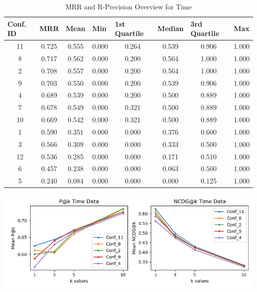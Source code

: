\documentclass[12pt]{article}
\begin{document}
\begin{table}[H]
\centering
\begin{tabular}{|c|c|c|c|c|c|c|c|}
\hline
\multicolumn{1}{|l|}{\textbf{Conf. ID}} &
  \multicolumn{1}{l|}{\textbf{MRR}} &
  \multicolumn{1}{l|}{\textbf{Mean}} &
  \multicolumn{1}{l|}{\textbf{Min}} &
  \multicolumn{1}{l|}{\textbf{1st Quartile}} &
  \multicolumn{1}{l|}{\textbf{Median}} &
  \multicolumn{1}{l|}{\textbf{3rd Quartile}} &
  \multicolumn{1}{l|}{\textbf{Max}} \\ \hline
11 & 0.725 & 0.555 & 0.000 & 0.264 & 0.539 & 0.906 & 1.000 \\ \hline
8  & 0.717 & 0.562 & 0.000 & 0.200 & 0.564 & 1.000 & 1.000 \\ \hline
2  & 0.708 & 0.557 & 0.000 & 0.200 & 0.564 & 1.000 & 1.000 \\ \hline
9  & 0.703 & 0.550 & 0.000 & 0.200 & 0.539 & 0.906 & 1.000 \\ \hline
4  & 0.689 & 0.539 & 0.000 & 0.200 & 0.500 & 0.889 & 1.000 \\ \hline
7  & 0.678 & 0.549 & 0.000 & 0.321 & 0.500 & 0.889 & 1.000 \\ \hline
10 & 0.669 & 0.542 & 0.000 & 0.321 & 0.500 & 0.889 & 1.000 \\ \hline
1  & 0.590 & 0.351 & 0.000 & 0.000 & 0.376 & 0.600 & 1.000 \\ \hline
3  & 0.566 & 0.309 & 0.000 & 0.000 & 0.333 & 0.500 & 1.000 \\ \hline
12 & 0.536 & 0.285 & 0.000 & 0.000 & 0.171 & 0.510 & 1.000 \\ \hline
6  & 0.457 & 0.238 & 0.000 & 0.000 & 0.063 & 0.500 & 1.000 \\ \hline
5  & 0.240 & 0.084 & 0.000 & 0.000 & 0.000 & 0.125 & 1.000 \\ \hline
\end{tabular}
\caption{MRR and R-Precision Overview for Time}
\label{tab:my-table}
\end{table}

\begin{center}
\includegraphics[scale=.75]{TimePlot.png}
\end{center}
\end{document}
